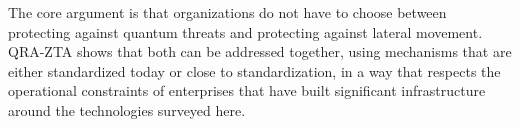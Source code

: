 \documentclass[conference]{IEEEtran}
\begin{document}
The core argument is that organizations do not have to choose
between protecting against quantum threats and protecting
against lateral movement. QRA-ZTA shows that both can be
addressed together, using mechanisms that are either
standardized today or close to standardization, in a way
that respects the operational constraints of enterprises that
have built significant infrastructure around the technologies
surveyed here.



\end{document}
